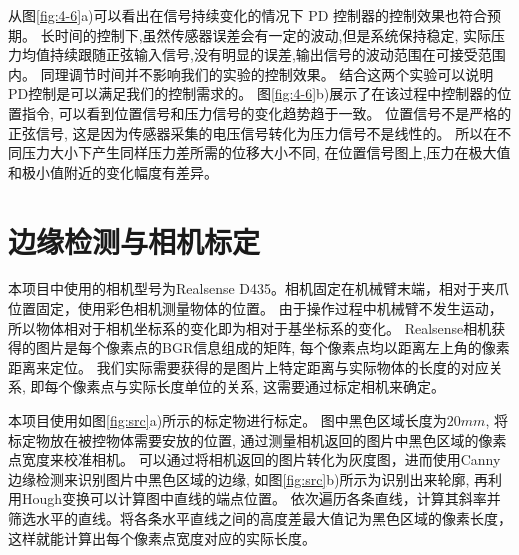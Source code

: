 从图\ref{fig:4-6}a)可以看出在信号持续变化的情况下 PD 控制器的控制效果也符合预期。
长时间的控制下,虽然传感器误差会有一定的波动,但是系统保持稳定,
实际压力均值持续跟随正弦输入信号,没有明显的误差,输出信号的波动范围在可接受范围内。
同理调节时间并不影响我们的实验的控制效果。
结合这两个实验可以说明 PD控制是可以满足我们的控制需求的。
图\ref{fig:4-6}b)展示了在该过程中控制器的位置指令,
可以看到位置信号和压力信号的变化趋势趋于一致。
位置信号不是严格的正弦信号, 这是因为传感器采集的电压信号转化为压力信号不是线性的。
所以在不同压力大小下产生同样压力差所需的位移大小不同,
在位置信号图上,压力在极大值和极小值附近的变化幅度有差异。


\section{边缘检测与相机标定}
本项目中使用的相机型号为Realsense D435。相机固定在机械臂末端，相对于夹爪位置固定，使用彩色相机测量物体的位置。
由于操作过程中机械臂不发生运动，
所以物体相对于相机坐标系的变化即为相对于基坐标系的变化。 
Realsense相机获得的图片是每个像素点的BGR信息组成的矩阵, 
每个像素点均以距离左上角的像素距离来定位。
我们实际需要获得的是图片上特定距离与实际物体的长度的对应关系, 
即每个像素点与实际长度单位的关系, 这需要通过标定相机来确定。

本项目使用如图\ref{fig:src}a)所示的标定物进行标定。
图中黑色区域长度为$20mm$, 将标定物放在被控物体需要安放的位置,
通过测量相机返回的图片中黑色区域的像素点宽度来校准相机。
可以通过将相机返回的图片转化为灰度图，进而使用Canny边缘检测来识别图片中黑色区域的边缘,
如图\ref{fig:src}b)所示为识别出来轮廓, 再利用Hough变换可以计算图中直线的端点位置。
依次遍历各条直线，计算其斜率并筛选水平的直线。将各条水平直线之间的高度差最大值记为黑色区域的像素长度，
这样就能计算出每个像素点宽度对应的实际长度。

